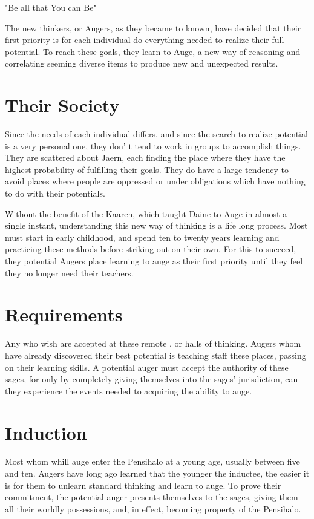 \begin{multicols*}{2}
"Be all that You can Be"

The new thinkers, or Augers, as they became to known, have decided that their first priority is for each individual do everything needed to realize their full potential. To reach these goals, they learn to Auge, a new way of reasoning and correlating seeming diverse items to produce new and unexpected results.

\section{Their Society}

Since the needs of each individual differs, and since the search to realize potential is a very personal one, they don' t tend to work in groups to accomplish things. They are scattered about Jaern, each finding the place where they have the highest probability of fulfilling their goals. They do have a large tendency to avoid places where people are oppressed or under obligations which have nothing to do with their potentials.

Without the benefit of the Kaaren, which taught Daine to Auge in almost a single instant, understanding this new way of thinking is a life long process. Most must start in early childhood, and spend ten to twenty years learning and practicing these methods before striking out on their own. For this to succeed, they potential Augers place learning to auge as their first priority until they feel they no longer need their teachers.

\section{Requirements}

Any who wish are accepted at these remote , or halls of thinking. Augers whom have already discovered their best potential is teaching staff these places, passing on their learning skills. A potential auger must accept the authority of these sages, for only by completely giving themselves into the sages'  jurisdiction, can they experience the events needed to acquiring the ability to auge.

\section{Induction}

Most whom whill auge enter the Pensihalo at a young age, usually between five and ten. Augers have long ago learned that the younger the inductee, the easier it is for them to unlearn standard thinking and learn to auge. To prove their commitment, the potential auger presents themselves to the sages, giving them all their worldly possessions, and, in effect, becoming property of the Pensihalo.


\end{multicols*}
